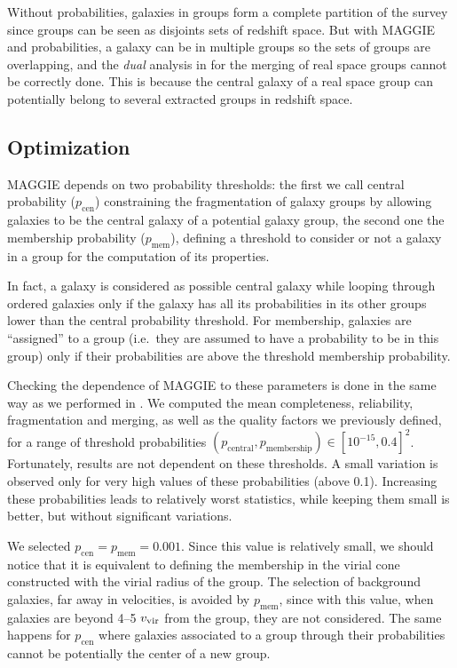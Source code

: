 Without probabilities, galaxies in groups form a complete partition of the
survey since groups can be seen as disjoints sets of redshift space. But with
MAGGIE and probabilities, a galaxy can be in multiple groups so the sets of
groups are overlapping, and the \emph{dual} analysis in \citet{Duarte+14} for
the merging of real space groups cannot be correctly done. This is because the
central galaxy of a real space group can potentially belong to several
extracted groups in redshift space.

\subsection{Optimization}

MAGGIE depends on two probability thresholds: the first we call central
probability ($p_\mathrm{cen}$) constraining the fragmentation of galaxy groups
by allowing galaxies to be the central galaxy of a potential galaxy group, the
second one the membership probability ($p_\mathrm{mem}$), defining a threshold
to consider or not a galaxy in a group for the computation of its properties.

In fact, a galaxy is considered as possible central galaxy while looping
through ordered galaxies only if the galaxy has all its probabilities in its
other groups lower than the central probability threshold. For membership,
galaxies are ``assigned'' to a group (i.e.\ they are assumed to have a
probability to be in this group) only if their probabilities are above the
threshold membership probability.

Checking the dependence of MAGGIE to these parameters is done in the same way
as we performed in . We computed
the mean completeness, reliability, fragmentation and merging, as well as the
quality factors we previously defined, for a range of threshold probabilities
$(p_\mathrm{central}, p_\mathrm{membership})\in{\left[10^{-15}, 0.4\right]}^2$.
Fortunately, results are not dependent on these thresholds. A small variation
is observed only for very high values of these probabilities (above 0.1).
Increasing these probabilities leads to relatively worst statistics, while
keeping them small is better, but without significant variations.

We selected $p_\mathrm{cen}=p_\mathrm{mem}=0.001$. Since this value is
relatively small, we should notice that it is equivalent to defining the
membership in the virial cone constructed with the virial radius of the group.
The selection of background galaxies, far away in velocities, is avoided by
$p_\mathrm{mem}$, since with this value, when galaxies are beyond 4--5 $v_{\rm vir}$
from the group, they are not considered. The same happens for $p_\mathrm{cen}$
where galaxies associated to a group through their probabilities cannot be
potentially the center of a new group.

